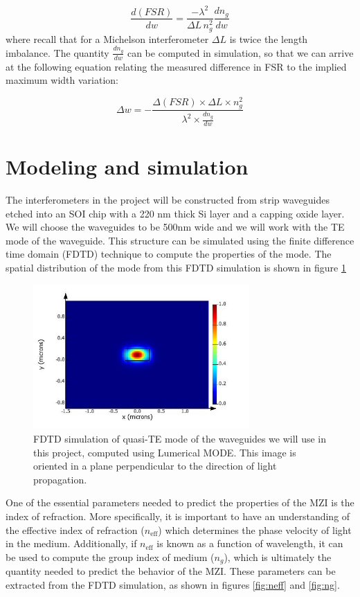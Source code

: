 \documentclass[journal]{IEEEtran}
\begin{document}
\begin{equation}
\frac{d(FSR)}{dw} = \frac{-\lambda^2}{\Delta L \, n_g^2} \frac{dn_g}{dw}
\end{equation}
where recall that for a Michelson interferometer $\Delta L$ is twice the length imbalance. The quantity $\frac{dn_g}{dw}$ can be computed in simulation, so that we can arrive at the following equation relating the measured difference in FSR to the implied maximum width variation:

\begin{equation}
\Delta w = - \frac{\Delta (FSR) \times \Delta L \times n_g^2}{\lambda^2 \times \frac{dn_g}{dw}}
\label{eq:dw}
\end{equation}

\section{Modeling and simulation}
\label{sec:model}


The interferometers in the project will be constructed from strip waveguides etched into an SOI chip with a 220 nm thick Si layer and a capping oxide layer. We will choose the waveguides to be 500nm wide and we will work with the TE mode of the waveguide. This structure can be simulated using the finite difference time domain (FDTD) technique to compute the properties of the mode. The spatial distribution of the mode from this FDTD simulation is shown in figure \ref{fig:mode}

\begin{figure}[t!]
  \centering
  \includegraphics[width = 3.25in]{fig/waveguide_TE.jpg}
  \caption{FDTD simulation of quasi-TE mode of the waveguides we will use in this project, computed using Lumerical MODE. This image is oriented in a plane perpendicular to the direction of light propagation.}
  \label{fig:mode}
\end{figure}

One of the essential parameters needed to predict the properties of the MZI is the index of refraction. More specifically, it is important to have an understanding of the effective index of refraction ($n_{\text{eff}}$) which determines the phase velocity of light in the medium. Additionally, if $n_{\text{eff}}$ is known as a function of wavelength, it can be used to compute the group index of medium ($n_g$), which is ultimately the quantity needed to predict the behavior of the MZI. These parameters can be extracted from the FDTD simulation, as shown in figures \ref{fig:neff} and \ref{fig:ng}. 
\end{document}
